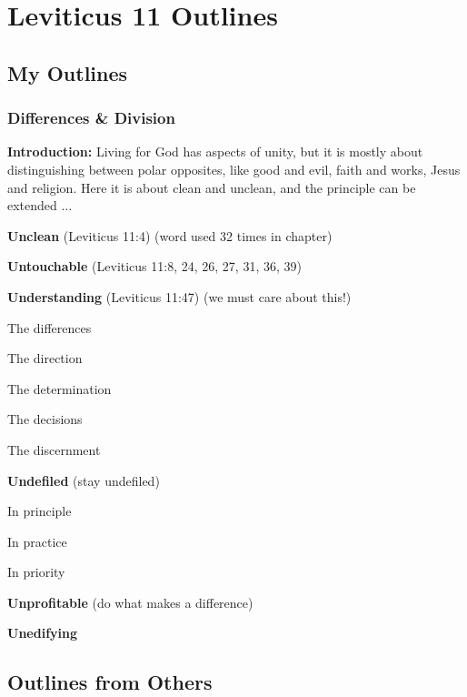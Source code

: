 \section{Leviticus  11 Outlines}

\subsection{My Outlines}

\subsubsection{Differences \& Division}
\textbf{Introduction: }Living for God has aspects of unity, but it is mostly about distinguishing between polar opposites, like good and evil, faith and works, Jesus and religion. Here it is about clean and unclean, and the principle can be extended $\hdots$
\begin{compactenum}[I.][7]
    \item \textbf{Unclean}  (Leviticus 11:4) (word used 32 times in chapter)
    \item \textbf{Untouchable}  (Leviticus 11:8, 24, 26, 27, 31, 36, 39)
    \item \textbf{Understanding}  (Leviticus 11:47) (we must care about this!)
    \begin{compactenum}[A.][7]
    	\item The differences
    	\item The direction
    	\item The determination
    	\item The decisions
    	\item The discernment
    \end{compactenum}
    \item \textbf{Undefiled} (stay undefiled)
    \begin{compactenum}[A.][7]
    	\item In principle
    	\item In practice
    	\item In priority
    \end{compactenum}
    \item \textbf{Unprofitable} (do what makes a difference)
    \item \textbf{Unedifying} 
\end{compactenum}

\subsection{Outlines from Others}